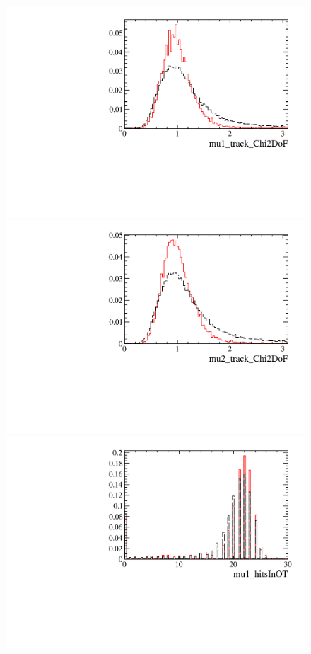 \begin{figure} [htb!]
\begin{center}
\includegraphics[scale=0.20]{figs/mu1_track_Chi2DoFPARTIALptcut.pdf}
\includegraphics[scale=0.20]{figs/mu2_track_Chi2DoFPARTIALptcut.pdf}
\includegraphics[scale=0.20]{figs/mu1_hitsInOTPARTIALptcut.pdf}

\end{center}
\end{figure}
